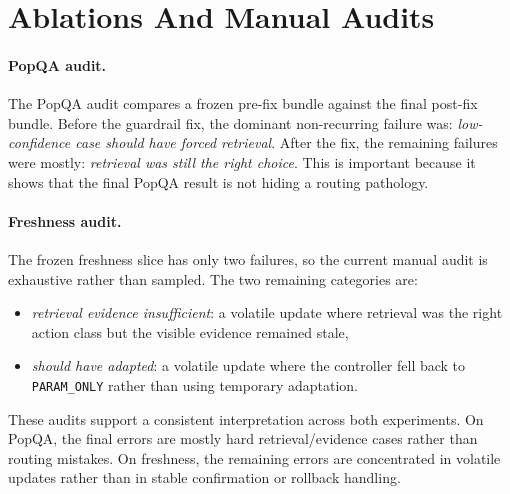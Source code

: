 \section{Ablations And Manual Audits}

\paragraph{PopQA audit.}
The PopQA audit compares a frozen pre-fix bundle against the final post-fix bundle. Before the guardrail fix, the dominant non-recurring failure was: \emph{low-confidence case should have forced retrieval}. After the fix, the remaining failures were mostly: \emph{retrieval was still the right choice}. This is important because it shows that the final PopQA result is not hiding a routing pathology.

\paragraph{Freshness audit.}
The frozen freshness slice has only two failures, so the current manual audit is exhaustive rather than sampled. The two remaining categories are:
\begin{itemize}[leftmargin=1.5em]
\item \emph{retrieval evidence insufficient}: a volatile update where retrieval was the right action class but the visible evidence remained stale,
\item \emph{should have adapted}: a volatile update where the controller fell back to \texttt{PARAM\_ONLY} rather than using temporary adaptation.
\end{itemize}

These audits support a consistent interpretation across both experiments. On PopQA, the final errors are mostly hard retrieval/evidence cases rather than routing mistakes. On freshness, the remaining errors are concentrated in volatile updates rather than in stable confirmation or rollback handling.
